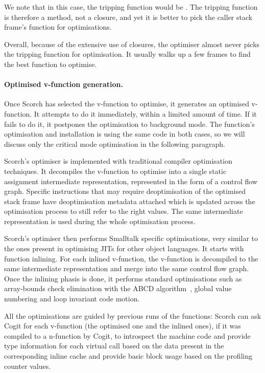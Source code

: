 \documentclass[a4paper,12pt,twoside]{../includes/ThesisStyle}
\begin{document}
We note that in this case, the tripping function would be . The tripping function is therefore a method, not a closure, and yet it is better to pick the caller stack frame's function for optimisations.

Overall, because of the extensive use of closures, the optimiser almost never picks the tripping function for optimisation. It usually walks up a few frames to find the best function to optimise. 

\paragraph{Optimised v-function generation.}
Once Scorch has selected the v-function to optimise, it generates an optimised v-function. It attempts to do it immediately, within a limited amount of time. If it fails to do it, it postpones the optimisation to background mode. The function's optimisation and installation is using the same code in both cases, so we will discuss only the critical mode optimisation in the following paragraph.

Scorch's optimiser is implemented with traditional compiler optimisation techniques. It decompiles the v-function to optimise into a single static assignment intermediate representation, represented in the form of a control flow graph. Specific instructions that may require deoptimisation of the optimised stack frame have deoptimisation metadata attached which is updated across the optimisation process to still refer to the right values. The same intermediate representation is used during the whole optimisation process.

Scorch's optimiser then performs Smalltalk specific optimisations, very similar to the ones present in optimising JITs for other object languages. It starts with function inlining. For each inlined v-function, the v-function is decompiled to the same intermediate representation and merge into the same control flow graph. Once the inlining phasis is done, it performs standard optimisations such as array-bounds check elimination with the ABCD algorithm~\cite{Bodi00a}, global value numbering and loop invariant code motion.

All the optimisations are guided by previous runs of the functions: Scorch can ask Cogit for each v-function (the optimised one and the inlined ones), if it was compiled to a n-function by Cogit, to introspect the machine code and provide type information for each virtual call based on the data present in the corresponding inline cache and provide basic block usage based on the profiling counter values.
\end{document}

